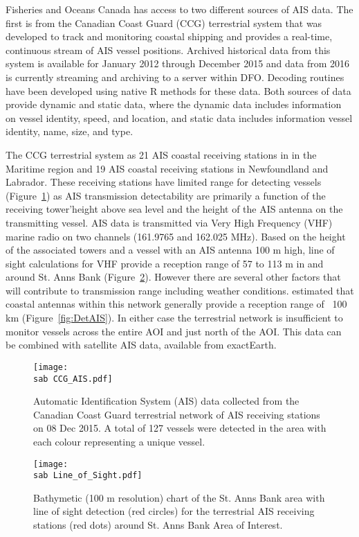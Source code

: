 \documentclass[letterpaper,portrait,11pt]{scrartcl}
\numberwithin{equation}{section}		%
\numberwithin{figure}{section}		%
\numberwithin{table}{section}				%
\newcommand{\ecomod}{\string~/ecomod_data/}   %
\newcommand{\sab}{\ecomod/mpa/sab/}   %
\begin{document}
Fisheries and Oceans Canada has access to two different sources of AIS data.  The first is from the Canadian Coast Guard (CCG) terrestrial system that was developed to track and monitoring coastal shipping and provides a real-time, continuous stream of AIS vessel positions.  Archived historical data from this system is available for January 2012 through December 2015 and data from 2016 is currently streaming and archiving to a server within DFO. Decoding routines have been developed using native R methods for these data.   Both sources of data provide dynamic and static data, where the dynamic data includes information on vessel identity, speed, and location, and static data includes information vessel identity, name, size, and type.   

The CCG terrestrial system as 21 AIS coastal receiving stations in in the Maritime region and 19 AIS coastal receiving stations in Newfoundland and Labrador.  These receiving stations have limited range for detecting vessels (Figure~\ref{fig:TAIS}) as AIS transmission detectability are primarily a function of the receiving tower\textquoteright height above sea level and the height of the AIS antenna on the transmitting vessel.  AIS data is transmitted via Very High Frequency (VHF) marine radio on two channels (161.9765 and 162.025 MHz).  Based on the height of the associated towers and a vessel with an AIS antenna 100 m high, line of sight calculations for VHF provide a reception range of  57 to 113 m in and around St. Anns Bank (Figure~\ref{fig:LOF}).  However there are several other factors that will contribute to transmission range including weather conditions. \cite{Simard2014shipping} estimated that coastal antennas within this network generally provide a reception range of ~100 km (Figure~\ref{fig:DetAIS}).  In either case the terrestrial network is insufficient to monitor vessels across the entire AOI and just north of the AOI. This data can be combined with satellite AIS data, available from exactEarth.


\begin{figure}[h]
  \centering
	\texttt{[image: \\sab CCG\_AIS.pdf]}
	\caption{Automatic Identification System (AIS) data collected from the Canadian Coast Guard terrestrial network of AIS receiving stations on 08 Dec 2015. A total of 127 vessels were detected in the area with each colour representing a unique vessel.}
    \label{fig:TAIS}
\end{figure}


\begin{figure}[h]
	\centering
	\texttt{[image: \\sab Line\_of\_Sight.pdf]}
	\caption{Bathymetic (100 m resolution) chart of the  St. Anns Bank area with line of sight detection (red circles) for the terrestrial AIS receiving stations (red dots) around St. Anns Bank Area of Interest.}
   \label{fig:LOF}
\end{figure}
\end{document}
